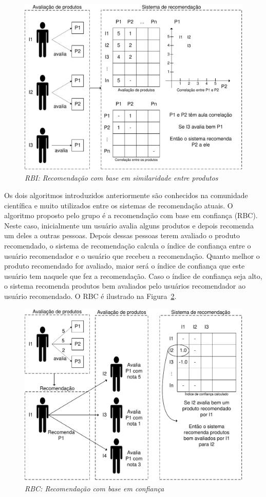 \begin{figure}
  \centering
  \includegraphics[width=\textwidth]{imagens/RBI}
  \caption{\it RBI: Recomendação com base em similaridade entre produtos}
  \label{fig:RBI}
\end{figure}

 Os dois algoritmos introduzidos anteriormente são conhecidos na comunidade científica e muito utilizados entre os sistemas de recomendação atuais. O algoritmo proposto pelo grupo é a recomendação com base em confiança (RBC). Neste caso, inicialmente um usuário avalia alguns produtos e depois recomenda um deles a outras pessoas. Depois dessas pessoas terem avaliado o produto recomendado, o sistema de recomendação calcula o índice de confiança entre o usuário recomendador e o usuário que recebeu a recomendação. Quanto melhor o produto recomendado for avaliado, maior será o índice de confiança que este usuário tem naquele que fez a recomendação. Caso o índice de confiança seja alto, o sistema recomenda produtos bem avaliados pelo usuários recomendador ao usuário recomendado. O RBC é ilustrado na Figura~\ref{fig:RBC}.

\begin{figure}
  \centering
  \includegraphics[width=\textwidth]{imagens/RBC}
  \caption{\it RBC: Recomendação com base em confiança}
  \label{fig:RBC}
\end{figure}

